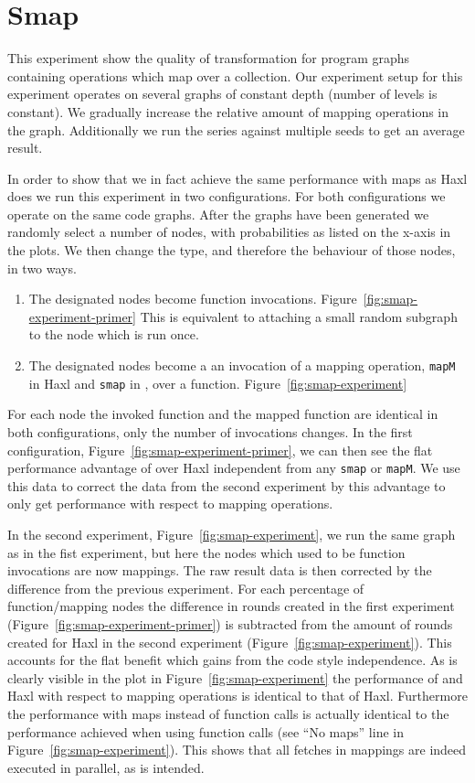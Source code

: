 \section{Smap}

This experiment show the quality of transformation for program graphs containing operations which map over a collection.
Our experiment setup for this experiment operates on several graphs of constant depth (number of levels is constant).
We gradually increase the relative amount of mapping operations in the graph.
Additionally we run the series against multiple seeds to get an average result.

In order to show that we in fact achieve the same performance with maps as Haxl does we run this experiment in two configurations.
For both configurations we operate on the same code graphs.
After the graphs have been generated we randomly select a number of nodes, with probabilities as listed on the x-axis in the plots.
We then change the type, and therefore the behaviour of those nodes, in two ways.

\begin{enumerate}
  \item The designated nodes become function invocations. Figure~\ref{fig:smap-experiment-primer}
        This is equivalent to attaching a small random subgraph to the node which is run once.
  \item The designated nodes become a an invocation of a mapping operation, \texttt{mapM} in Haxl and \texttt{smap} in \yauhau{}, over a function. Figure~\ref{fig:smap-experiment}
\end{enumerate}

For each node the invoked function and the mapped function are identical in both configurations, only the number of invocations changes.
In the first configuration, Figure~\ref{fig:smap-experiment-primer}, we can then see the flat performance advantage of \yauhau{} over Haxl independent from any \texttt{smap} or \texttt{mapM}.
We use this data to correct the data from the second experiment by this advantage to only get performance with respect to mapping operations.

In the second experiment, Figure~\ref{fig:smap-experiment}, we run the same graph as in the fist experiment, but here the nodes which used to be function invocations are now mappings.
The raw result data is then corrected by the difference from the previous experiment.
For each percentage of function/mapping nodes the difference in rounds created in the first experiment (Figure~\ref{fig:smap-experiment-primer}) is subtracted from the amount of rounds created for Haxl in the second experiment (Figure~\ref{fig:smap-experiment}).
This accounts for the flat benefit which \yauhau{} gains from the code style independence.
As is clearly visible in the plot in Figure~\ref{fig:smap-experiment} the performance of \yauhau{} and Haxl with respect to mapping operations is identical to that of Haxl.
Furthermore the performance with maps instead of function calls is actually identical to the performance achieved when using function calls (see ``No maps'' line in Figure~\ref{fig:smap-experiment}).
This shows that all fetches in mappings are indeed executed in parallel, as is intended.

